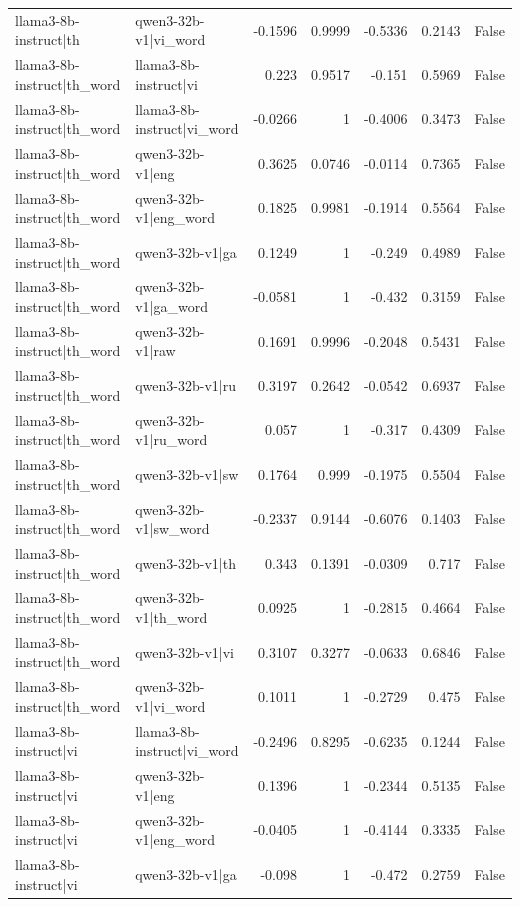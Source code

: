 \begin{table}
\begin{tabular}{l l r r r r l}
llama3-8b-instruct|th & qwen3-32b-v1|vi_word & -0.1596 & 0.9999 & -0.5336 & 0.2143 & False \\
llama3-8b-instruct|th_word & llama3-8b-instruct|vi & 0.223 & 0.9517 & -0.151 & 0.5969 & False \\
llama3-8b-instruct|th_word & llama3-8b-instruct|vi_word & -0.0266 & 1 & -0.4006 & 0.3473 & False \\
llama3-8b-instruct|th_word & qwen3-32b-v1|eng & 0.3625 & 0.0746 & -0.0114 & 0.7365 & False \\
llama3-8b-instruct|th_word & qwen3-32b-v1|eng_word & 0.1825 & 0.9981 & -0.1914 & 0.5564 & False \\
llama3-8b-instruct|th_word & qwen3-32b-v1|ga & 0.1249 & 1 & -0.249 & 0.4989 & False \\
llama3-8b-instruct|th_word & qwen3-32b-v1|ga_word & -0.0581 & 1 & -0.432 & 0.3159 & False \\
llama3-8b-instruct|th_word & qwen3-32b-v1|raw & 0.1691 & 0.9996 & -0.2048 & 0.5431 & False \\
llama3-8b-instruct|th_word & qwen3-32b-v1|ru & 0.3197 & 0.2642 & -0.0542 & 0.6937 & False \\
llama3-8b-instruct|th_word & qwen3-32b-v1|ru_word & 0.057 & 1 & -0.317 & 0.4309 & False \\
llama3-8b-instruct|th_word & qwen3-32b-v1|sw & 0.1764 & 0.999 & -0.1975 & 0.5504 & False \\
llama3-8b-instruct|th_word & qwen3-32b-v1|sw_word & -0.2337 & 0.9144 & -0.6076 & 0.1403 & False \\
llama3-8b-instruct|th_word & qwen3-32b-v1|th & 0.343 & 0.1391 & -0.0309 & 0.717 & False \\
llama3-8b-instruct|th_word & qwen3-32b-v1|th_word & 0.0925 & 1 & -0.2815 & 0.4664 & False \\
llama3-8b-instruct|th_word & qwen3-32b-v1|vi & 0.3107 & 0.3277 & -0.0633 & 0.6846 & False \\
llama3-8b-instruct|th_word & qwen3-32b-v1|vi_word & 0.1011 & 1 & -0.2729 & 0.475 & False \\
llama3-8b-instruct|vi & llama3-8b-instruct|vi_word & -0.2496 & 0.8295 & -0.6235 & 0.1244 & False \\
llama3-8b-instruct|vi & qwen3-32b-v1|eng & 0.1396 & 1 & -0.2344 & 0.5135 & False \\
llama3-8b-instruct|vi & qwen3-32b-v1|eng_word & -0.0405 & 1 & -0.4144 & 0.3335 & False \\
llama3-8b-instruct|vi & qwen3-32b-v1|ga & -0.098 & 1 & -0.472 & 0.2759 & False \\

\end{tabular}
\end{table}
